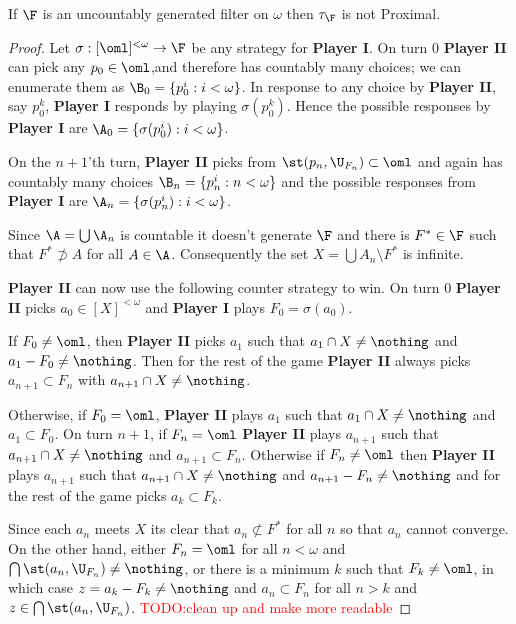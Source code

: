 \documentclass{article}
\begin{document}
\begin{prop}
    If \(\F\) is an uncountably generated filter on \(\omega\) then \(\tau_{\F}\) is not Proximal.
\end{prop}
\begin{proof}
    Let \(\sigma : [\oml]^{<\omega} \to \F\) be any strategy for \textbf{Player I}. On turn \(0\) \textbf{Player II} can pick any \(p_0 \in \oml\),and therefore has countably many choices; we can enumerate them as \(\B_0 = \{p_0^i: i < \omega\}\). In response to any choice by \textbf{Player II}, say \(p_0^k\), \textbf{Player I} responds by playing \(\sigma(p_0^k)\). Hence the possible responses by \textbf{Player I} are \(\A_0 = \{\sigma(p_0^i): i < \omega\}\). 
    
    On the \(n + 1\)'th turn, \textbf{Player II} picks from \(\st(p_n, \U_{F_n}) \subset \oml\) and again has countably many choices \(\B_n = \{p_n^i:n < \omega\}\) and the possible responses from \textbf{Player I} are \(\A_n = \{\sigma(p_n^i):i < \omega\}\).

    Since \(\A = \bigcup \A_n\) is countable it doesn't generate \(\F\) and there is \(F^{\ast} \in \F\) such that \(F^{\ast} \not \supset A\) for all \(A \in \A\). Consequently the set \(X = \bigcup A_n\setminus F^{\ast}\) is infinite.

    \textbf{Player II} can now use the following counter strategy to win. On turn 0 \textbf{Player II} picks \(a_0 \in [X]^{<\omega}\) and \textbf{Player I} plays \(F_0 = \sigma(a_0)\). 
    
    If \(F_0 \neq \oml\), then \textbf{Player II} picks \(a_1\) such that \(a_1 \cap X \neq\nothing\) and \(a_1 - F_0 \neq \nothing\). Then for the rest of the game \textbf{Player II} always picks \(a_{n + 1} \subset F_n\) with \(a_{n + 1}\cap X \neq \nothing\).
    
    Otherwise, if \(F_0 = \oml\), \textbf{Player II} plays \(a_1\) such that \(a_1\cap X \neq \nothing\) and \(a_1 \subset F_0\). On turn \(n + 1\), if \(F_n = \oml\) \textbf{Player II} plays \(a_{n + 1}\) such that \(a_{n + 1}\cap X \neq \nothing\) and \(a_{n + 1}\subset F_n\). Otherwise if \(F_n \neq \oml\) then \textbf{Player II} plays \(a_{n + 1}\) such that \(a_{n + 1}\cap X \neq \nothing\) and \(a_{n + 1} - F_n \neq\nothing\) and for the rest of the game picks \(a_k \subset F_k\).

    Since each \(a_n\) meets \(X\) its clear that \(a_n \not \subset F^{\ast}\) for all \(n\) so that \(a_n\) cannot converge. On the other hand, either \(F_n = \oml\) for all \(n < \omega\) and 
    \(\bigcap\st(a_n, \U_{F_n}) \neq\nothing\), or there is a minimum \(k\) such that \(F_k \neq \oml\), in which case \(z = a_k - F_k \neq \nothing\) and \(a_n \subset F_n\) for all \(n > k\) and \(z \in \bigcap\st(a_n, \U_{F_n})\). 
    \textcolor{red}{TODO:clean up and make more readable}
\end{proof}
%
\end{document}
